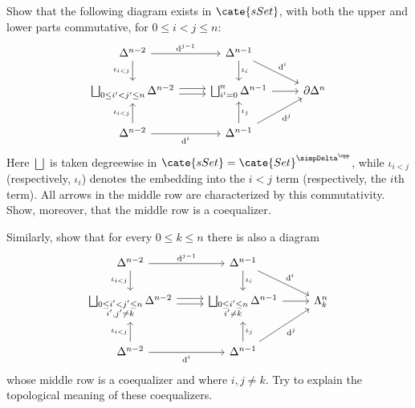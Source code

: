 	\item Show that the following diagram exists in $\cate{sSet}$, with both
	the upper and lower parts commutative, for $0\leq i<j\leq n$:
	\[\begin{tikzcd}
		\Delta^{n-2} \arrow[d, "{\iota_{i < j}}"'] \arrow[r, "{\mathrm{d}^{j-1}}"] & \Delta^{n-1} \arrow[d, "\iota_i"] \arrow[rd, "{\mathrm{d}^i}"] & \\
		\bigsqcup_{0 \leq i' < j' \leq n} \Delta^{n-2} \arrow[shift left, r] \arrow[shift right, r] & \bigsqcup_{i' = 0}^n \Delta^{n-1} \arrow[r] & \partial \Delta^n \\
		\Delta^{n-2} \arrow[u, "{\iota_{i < j}}"] \arrow[r, "{\mathrm{d}^i}"'] & \Delta^{n-1} \arrow[u, "\iota_j"'] \arrow[ru, "{\mathrm{d}^j}"'] &
	\end{tikzcd}\]
	Here $\bigsqcup$ is taken degreewise in
	$\cate{sSet}=\cate{Set}^{\simpDelta^{\opp}}$, while $\iota_{i<j}$
	(respectively, $\iota_i$) denotes the embedding into the $i<j$ term
	(respectively, the $i$th term). All arrows in the middle row are
	characterized by this commutativity. Show, moreover, that the middle row is
	a coequalizer.

	Similarly, show that for every $0\leq k\leq n$ there is also a diagram
	\[\begin{tikzcd}
		\Delta^{n-2} \arrow[d, "{\iota_{i < j}}"'] \arrow[r, "{\mathrm{d}^{j-1}}"] & \Delta^{n-1} \arrow[d, "\iota_i"] \arrow[rd, "{\mathrm{d}^i}"] & \\
		\bigsqcup_{\substack{0 \leq i' < j' \leq n \\ i', j' \neq k}} \Delta^{n-2} \arrow[shift left, r] \arrow[shift right, r] & \bigsqcup_{\substack{0 \leq i' \leq n \\ i' \neq k}} \Delta^{n-1} \arrow[r] & \Lambda^n_k \\
		\Delta^{n-2} \arrow[u, "{\iota_{i < j}}"] \arrow[r, "{\mathrm{d}^i}"'] & \Delta^{n-1} \arrow[u, "\iota_j"'] \arrow[ru, "{\mathrm{d}^j}"'] &
	\end{tikzcd}\]
	whose middle row is a coequalizer and where $i,j\neq k$. Try to explain
	the topological meaning of these coequalizers.

